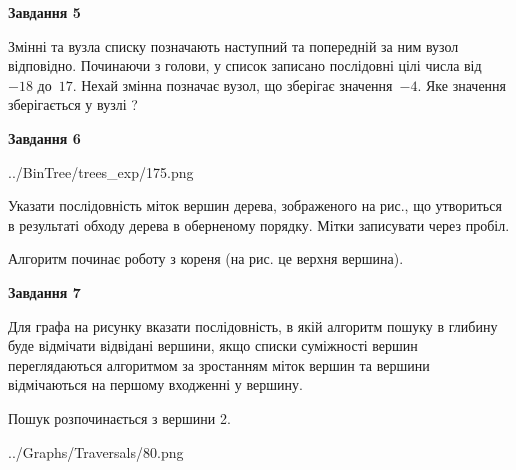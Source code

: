 \documentclass[12pt, ukrainian]{article}
\begin{document}
{\begin {large}
{\begin {center}\textbf{Завдання 5}\end {center}}\par
Змінні  та  вузла списку позначають наступний та попередній за ним вузол відповідно. Починаючи з голови, у список записано послідовні цілі числа від~$-18$ до~$17$. Нехай змінна  позначає вузол, що зберігає значення~$-4$.
Яке значення зберігається у вузлі  ?\par
\newpage

{\begin {center}\textbf{Завдання 6}\end {center}}\par

\begin{center}
	{../BinTree/trees_exp/175.png}
\end{center}
Указати послідовність міток вершин дерева, зображеного на рис., що утвориться в результаті обходу дерева в оберненому порядку. Мітки записувати через пробіл.\par Алгоритм починає роботу з кореня (на рис. це верхня вершина).\par
\newpage

{\begin {center}\textbf{Завдання 7}\end {center}}\par
Для графа на рисунку вказати послідовність, в якій алгоритм пошуку в глибину буде відмічати відвідані вершини, якщо списки суміжності вершин переглядаються алгоритмом за зростанням міток вершин та вершини відмічаються на першому вход\-женні у вершину.\par
Пошук розпочинається з вершини 2.\par

\begin{center}
	{../Graphs/Traversals/80.png}
\end{center}\par
\newpage


\end{large}}
\end{document}

